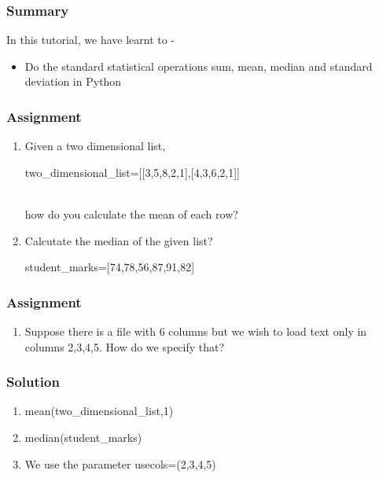 \documentclass[17pt]{beamer}
\newcounter{saveenumi}
\newcommand{\seti}{\setcounter{saveenumi}{\value{enumi}}}
\newcommand{\conti}{\setcounter{enumi}{\value{saveenumi}}}
\begin{document}
\begin{frame}
\frametitle{Summary}
\label{sec-7}

  In this tutorial, we have learnt to -\pause


\begin{itemize}
\item Do the standard statistical operations sum, mean,
    median and standard deviation in Python
\end{itemize}
\end{frame}
\begin{frame}
\frametitle{Assignment}
\label{sec-8}

\begin{enumerate}
\item Given a two dimensional list,\\
      \begin{small}two\_dimensional\_list=[[3,5,8,2,1],[4,3,6,2,1]]\end{small}\\
     how do you calculate the mean  of each row?
\item Calcutate the median of the given list?\\
     \begin{small}student\_marks=[74,78,56,87,91,82]\end{small}
     \seti
\end{enumerate}
\end{frame}
\begin{frame}
\frametitle{Assignment}
\label{sec-8}

\begin{enumerate}
\conti
\item Suppose there is a file with 6 columns but we wish to load text 
     only in columns 2,3,4,5. How do we specify that?
\end{enumerate}
\end{frame}
\begin{frame}
\frametitle{Solution}
\label{sec-9}


\begin{enumerate}
\item mean(two\_dimensional\_list,1)
\vspace{12pt}
\item median(student\_marks)
\vspace{12pt}
\item We use the parameter usecols=(2,3,4,5)
\end{enumerate}
\end{frame}
\end{document}

